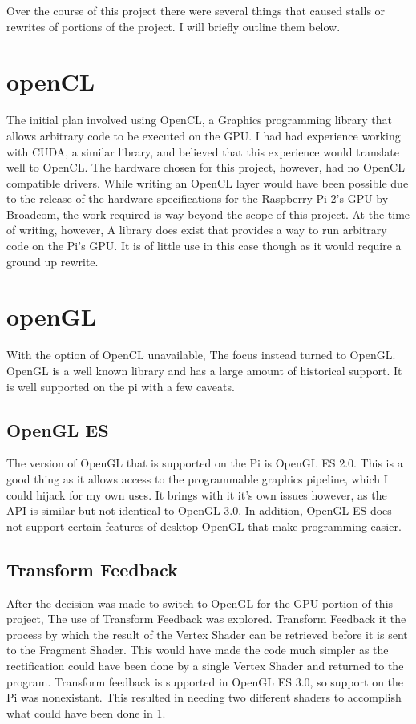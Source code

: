 
Over the course of this project there were several things that caused stalls or rewrites of portions of the project.  I will briefly outline them below.

\section{openCL}
The initial plan involved using OpenCL, a Graphics programming library that allows arbitrary code to be executed on the GPU.  I had had experience working with CUDA, a similar library, and believed that this experience would translate well to OpenCL.  The hardware chosen for this project, however, had no OpenCL compatible drivers.  While writing an OpenCL layer would have been possible due to the release of the hardware specifications for the Raspberry Pi 2's GPU by Broadcom, the work required is way beyond the scope of this project.  At the time of writing, however, A library does exist that provides a way to run arbitrary code on the Pi's GPU.  It is of little use in this case though as it would require a ground up rewrite.

\section{openGL}
With the option of OpenCL unavailable, The focus instead turned to OpenGL.  OpenGL is a well known library and has a large amount of historical support.  It is well supported on the pi with a few caveats.
\subsection{OpenGL ES}
The version of OpenGL that is supported on the Pi is OpenGL ES 2.0.  This is a good thing as it allows access to the programmable graphics pipeline, which I could hijack for my own uses.  It brings with it it's own issues however, as the API is similar but not identical to OpenGL 3.0.  In addition, OpenGL ES does not support certain features of desktop OpenGL that make programming easier.
\subsection{Transform Feedback}
After the decision was made to switch to OpenGL for the GPU portion of this project, The use of Transform Feedback was explored.  Transform Feedback it the process by which the result of the Vertex Shader can be retrieved before it is sent to the Fragment Shader.  This would have made the code much simpler as the rectification could have been done by a single Vertex Shader and returned to the program.  Transform feedback is supported in OpenGL ES 3.0, so support on the Pi was nonexistant.  This resulted in needing two different shaders to accomplish what could have been done in 1.
